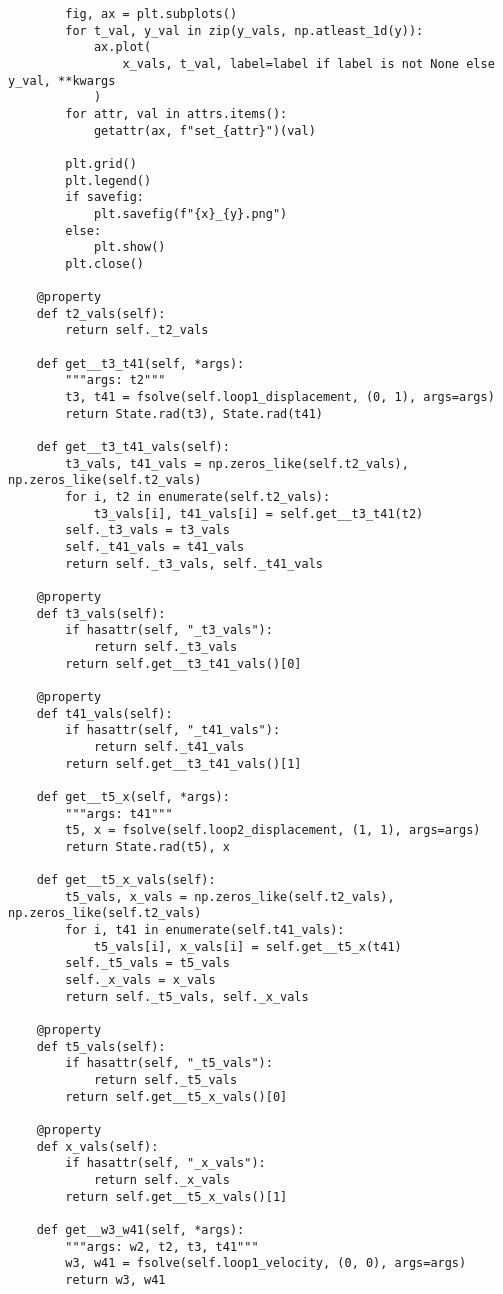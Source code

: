 \documentclass[12pt]{article}
\begin{document}
\begin{lstlisting}
        fig, ax = plt.subplots()
        for t_val, y_val in zip(y_vals, np.atleast_1d(y)):
            ax.plot(
                x_vals, t_val, label=label if label is not None else y_val, **kwargs
            )
        for attr, val in attrs.items():
            getattr(ax, f"set_{attr}")(val)

        plt.grid()
        plt.legend()
        if savefig:
            plt.savefig(f"{x}_{y}.png")
        else:
            plt.show()
        plt.close()

    @property
    def t2_vals(self):
        return self._t2_vals

    def get__t3_t41(self, *args):
        """args: t2"""
        t3, t41 = fsolve(self.loop1_displacement, (0, 1), args=args)
        return State.rad(t3), State.rad(t41)

    def get__t3_t41_vals(self):
        t3_vals, t41_vals = np.zeros_like(self.t2_vals), np.zeros_like(self.t2_vals)
        for i, t2 in enumerate(self.t2_vals):
            t3_vals[i], t41_vals[i] = self.get__t3_t41(t2)
        self._t3_vals = t3_vals
        self._t41_vals = t41_vals
        return self._t3_vals, self._t41_vals

    @property
    def t3_vals(self):
        if hasattr(self, "_t3_vals"):
            return self._t3_vals
        return self.get__t3_t41_vals()[0]

    @property
    def t41_vals(self):
        if hasattr(self, "_t41_vals"):
            return self._t41_vals
        return self.get__t3_t41_vals()[1]

    def get__t5_x(self, *args):
        """args: t41"""
        t5, x = fsolve(self.loop2_displacement, (1, 1), args=args)
        return State.rad(t5), x

    def get__t5_x_vals(self):
        t5_vals, x_vals = np.zeros_like(self.t2_vals), np.zeros_like(self.t2_vals)
        for i, t41 in enumerate(self.t41_vals):
            t5_vals[i], x_vals[i] = self.get__t5_x(t41)
        self._t5_vals = t5_vals
        self._x_vals = x_vals
        return self._t5_vals, self._x_vals

    @property
    def t5_vals(self):
        if hasattr(self, "_t5_vals"):
            return self._t5_vals
        return self.get__t5_x_vals()[0]

    @property
    def x_vals(self):
        if hasattr(self, "_x_vals"):
            return self._x_vals
        return self.get__t5_x_vals()[1]

    def get__w3_w41(self, *args):
        """args: w2, t2, t3, t41"""
        w3, w41 = fsolve(self.loop1_velocity, (0, 0), args=args)
        return w3, w41


\end{lstlisting}
\end{document}
